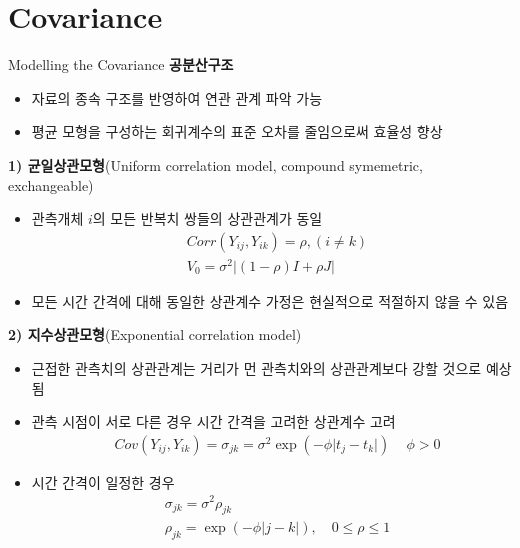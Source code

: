 \documentclass[9pt, xelatex]{beamer}
\begin{document}
\section{Covariance}{
	\begin{frame}[allowframebreaks]{Modelling the Covariance}
		\textbf{공분산구조}\\
		\vspace{4mm}
		\begin{itemize}
			\item 자료의 종속 구조를 반영하여 연관 관계 파악 가능  
			\item 평균 모형을 구성하는 회귀계수의 표준 오차를 줄임으로써 효율성 향상
		\end{itemize}
	
	\vspace{4mm}
	\textbf{1) 균일상관모형}(Uniform correlation model, compound symemetric, exchangeable) \\
	\vspace{2mm}
	\begin{itemize}
		\item 관측개체 $i$의 모든 반복치 쌍들의 상관관계가 동일
		\begin{align*}
			& Corr(Y_{ij},Y_{ik})=\rho, (i \neq k) \\
			& V_0 = \sigma^2 \vert (1-\rho)I + \rho J \vert 	
		\end{align*} %
		\item 모든 시간 간격에 대해 동일한 상관계수 가정은 현실적으로 적절하지 않을 수 있음
	\end{itemize}	

	\framebreak
	
	\textbf{2) 지수상관모형}(Exponential correlation model) \\
	\vspace{2mm}	
	\begin{itemize}
		\item 근접한 관측치의 상관관계는 거리가 먼 관측치와의 상관관계보다 강할 것으로 예상됨
		\item 관측 시점이 서로 다른 경우 시간 간격을 고려한 상관계수 고려
		\begin{align*}
			& Cov(Y_{ij},Y_{ik})= \sigma_{jk} = \sigma^2 \exp (-\phi \vert t_j - t_k \vert)\, \quad \phi>0
		\end{align*} 
		\item 시간 간격이 일정한 경우 
		\begin{align*}
			& \sigma_{jk} = \sigma^2 \rho_{jk} \\
			& \rho_{jk} = \exp (-\phi \vert j-k \vert), \quad 0 \leq \rho \leq 1
		\end{align*} 
	\end{itemize}	


\end{frame}}
\end{document}
